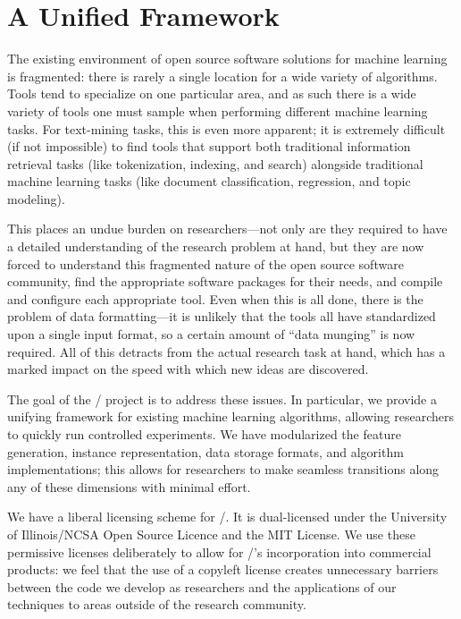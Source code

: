 \section{A Unified Framework}

The existing environment of open source software solutions for machine learning
is fragmented: there is rarely a single location for a wide variety of
algorithms. Tools tend to specialize on one particular area, and as such there
is a wide variety of tools one must sample when performing different machine
learning tasks. For text-mining tasks, this is even more apparent; it is
extremely difficult (if not impossible) to find tools that support both
traditional information retrieval tasks (like tokenization, indexing, and
search) alongside traditional machine learning tasks (like document
classification, regression, and topic modeling).

This places an undue burden on researchers---not only are they required to have
a detailed understanding of the research problem at hand, but they are now
forced to understand this fragmented nature of the open source software
community, find the appropriate software packages for their needs, and compile
and configure each appropriate tool. Even when this is all done, there is the
problem of data formatting---it is unlikely that the tools all have standardized
upon a single input format, so a certain amount of ``data munging'' is now
required. All of this detracts from the actual research task at hand, which has
a marked impact on the speed with which new ideas are discovered.

The goal of the \meta/ project is to address these issues. In particular,
we provide a unifying framework for existing machine learning algorithms,
allowing researchers to quickly run controlled experiments. We have modularized
the feature generation, instance representation, data storage formats, and
algorithm implementations; this allows for researchers to make seamless
transitions along any of these dimensions with minimal effort.

We have a liberal licensing scheme for \meta/. It is dual-licensed under
the University of Illinois/NCSA Open Source Licence and the MIT License. We use
these permissive licenses deliberately to allow for \meta/'s
incorporation into commercial products: we feel that the use of a copyleft
license creates unnecessary barriers between the code we develop as researchers
and the applications of our techniques to areas outside of the research
community.
